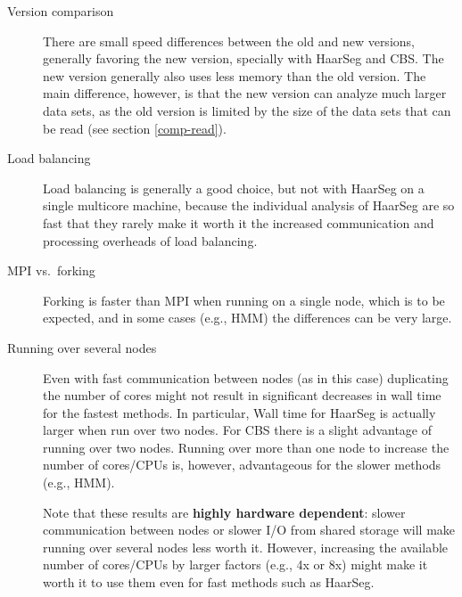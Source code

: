 \documentclass[a4paper,11pt]{article}
\begin{document}
\begin{description}

\item[Version comparison] There are small speed differences between the
  old and new versions, generally favoring the new version, specially with
  HaarSeg and CBS. The new version generally also uses less memory than
  the old version. The main difference, however, is that the new version
  can analyze much larger data sets, as the old version is limited by the
  size of the data sets that can be read (see section \ref{comp-read}).

\item[Load balancing] Load balancing is generally a good choice, but not
  with HaarSeg on a single multicore machine, because the individual
  analysis of HaarSeg are so fast that they rarely make it worth it the
  increased communication and processing overheads of load balancing.

\item[MPI vs.\ forking] Forking is faster than MPI when running on a
  single node, which is to be expected, and in some cases (e.g., HMM) the
  differences can be very large.

\item[Running over several nodes] Even with fast communication between
  nodes (as in this case) duplicating the number of cores might not result
  in significant decreases in wall time for the fastest methods. In
  particular, Wall time for HaarSeg is actually larger when run over two
  nodes. For CBS there is a slight advantage of running over two
  nodes. Running over more than one node to increase the number of
  cores/CPUs is, however, advantageous for the slower methods (e.g.,
  HMM).  
  
  Note that these results are \textbf{highly hardware dependent}: slower
  communication between nodes or slower I/O from shared storage will make
  running over several nodes less worth it. However, increasing the
  available number of cores/CPUs by larger factors (e.g., 4x or 8x) might
  make it worth it to use them even for fast methods such as HaarSeg.

\end{description}
\end{document}
